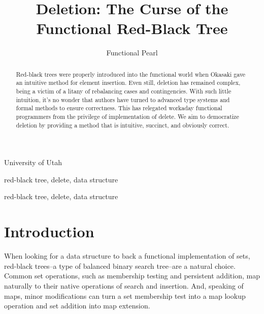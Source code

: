 \documentclass[preprint]{sigplanconf}
\begin{document}
\copyrightdata{[to be supplied]} 


\title{Deletion: The Curse of the Functional Red-Black Tree}
\subtitle{Functional Pearl}

           {University of Utah}

\maketitle

\begin{abstract}
Red-black trees were properly introduced into the functional world when Okasaki gave an intuitive method for element insertion. Even still, deletion has remained complex, being a victim of a litany of rebalancing cases and contingencies. With such little intuition, it's no wonder that authors have turned to advanced type systems and formal methods to ensure correctness. This has relegated workaday functional programmers from the privilege of implementation of delete. We aim to democratize deletion by providing a method that is intuitive, succinct, and obviously correct.
\end{abstract}


\terms
red-black tree, delete, data structure

\keywords
red-black tree, delete, data structure

\section{Introduction}

When looking for a data structure to back a functional implementation of sets, red-black trees--a type of balanced binary search tree--are a natural choice. Common set operations, such as membership testing and persistent addition, map naturally to their native operations of search and insertion. And, speaking of maps, minor modifications can turn a set membership test into a map lookup operation and set addition into map extension.
\end{document}
